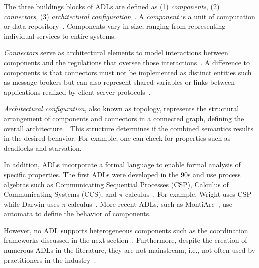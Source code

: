 \documentclass[runningheads]{llncs}
\begin{document}
The three buildings blocks of ADLs are defined as (1) \textit{components}, (2) \textit{connectors}, (3) \textit{architectural configuration}~\cite{medvidovicClassificationComparisonFramework2000,medvidovicFrameworkClassifyingComparing1997}.
A \textit{component} is a unit of computation or data repository~\cite{medvidovicClassificationComparisonFramework2000}.
Components vary in size, ranging from representing individual services to entire systems.

\textit{Connectors} serve as architectural elements to model interactions between components and the regulations that oversee those interactions~\cite{medvidovicClassificationComparisonFramework2000}.
A difference to components is that connectors must not be implemented as distinct entities such as message brokers but can also represent shared variables or links between applications realized by client-server protocols~\cite{medvidovicClassificationComparisonFramework2000}.

\textit{Architectural configuration}, also known as topology, represents the structural arrangement of components and connectors in a connected graph, defining the overall architecture~\cite{medvidovicClassificationComparisonFramework2000}.
This structure determines if the combined semantics results in the desired behavior.
For example, one can check for properties such as deadlocks and starvation.

In addition, ADLs incorporate a formal language to enable formal analysis of specific properties.
The first ADLs were developed in the 90s and use process algebras such as Communicating Sequential Processes (CSP), Calculus of Communicating Systems (CCS), and $\pi$-calculus~\cite{ozkayaAreWeThere2013}.
For example, Wright uses CSP~\cite{allenFormalBasisArchitectural1997} while Darwin uses $\pi$-calculus~\cite{mageeSpecifyingDistributedSoftware1995}.
More recent ADLs, such as MontiArc~\cite{haberMontiArcArchitecturalModeling2014}, use automata to define the behavior of components.

However, no ADL supports heterogeneous components such as the coordination frameworks discussed in the next section~\cite{medvidovicClassificationComparisonFramework2000}.
Furthermore, despite the creation of numerous ADLs in the literature, they are not mainstream, i.e., not often used by practitioners in the industry~\cite{clementsSurveyArchitectureDescription1996,woodsArchitectureDescriptionLanguages2005,pandeyArchitecturalDescriptionLanguages2010,ozkayaAreWeThere2013,medvidovicMovingArchitecturalDescription2006}.
\end{document}
